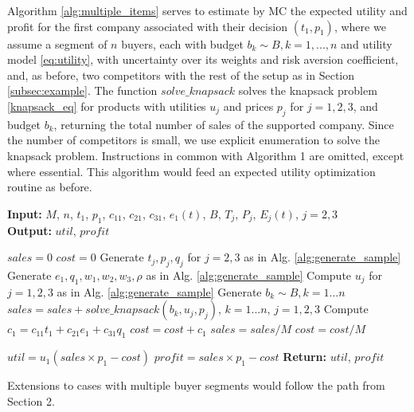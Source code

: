 \documentclass[a4paper,fleqn, 11pt]{cas-sc}
\begin{document}
Algorithm \ref{alg:multiple_items} serves to estimate by MC the expected utility and profit for the first company associated with their decision $(t_1, p_1)$, where we assume a segment of $n$ buyers, each with budget $b_k\sim B, k=1,...,n$ and utility model \eqref{eq:utility}, with uncertainty over its weights and risk aversion coefficient, and, as before, two competitors with the rest of the setup as in Section \ref{subsec:example}. 
  The function $solve\_knapsack$ solves the knapsack problem \eqref{knapsack_eq} for products with utilities $u_j$ and prices $p_j$ for $j=1, 2, 3$, and budget $b_k$, returning the total number of sales of the supported company. 
     Since the number of competitors is small, we use explicit enumeration to solve the knapsack problem. 
Instructions in common with Algorithm 1 are omitted, except 
 where essential. 
This algorithm would feed an expected utility optimization routine as before. 
\begin{algorithm}
\caption{} 
\label{alg:multiple_items}
\textbf{Input:} $M$, $n$, $t_1 $, $p_1 $, $c_{11}$, $c_{21}$, $c_{31}$, $e_1(t)$, $B$, $T_j$, $P_j$, $E_j(t)$, $j=2,3$  \\
\textbf{Output:} $util$, $profit$
\begin{algorithmic}[1]
\State $sales = 0$
\State $cost = 0$
\State Generate $t_j, p_j, q_j$ for $j=2,3$ as in Alg. \ref{alg:generate_sample} 
\State Generate $e_1, q_1, w_1, w_2 , w_3, \rho$  as in Alg. \ref{alg:generate_sample} 
\State Compute $u_j$ for $ j=1, 2,3$ as in Alg. \ref{alg:generate_sample} 
\State Generate $b_k\sim B, k=1...n$ 
\State $sales = sales + solve\_knapsack(b_k, u_j, p_j)$, $k=1...n$, $j=1,2,3$
\State Compute $c_1 = c_{11} t_1 + c_{21} e_1 + c_{31} q_1$
\State $cost = cost + c_1$
\EndFor
\State $sales = sales / M$
\State $cost = cost / M$

\State $util=u_1(sales \times p_1 - cost)$
\State $profit=sales \times p_1 - cost$
\State \textbf{Return:}  $util$, $profit$
\end{algorithmic}
\end{algorithm} 
 Extensions to cases with multiple buyer segments would follow the path from Section 2.
\end{document}
